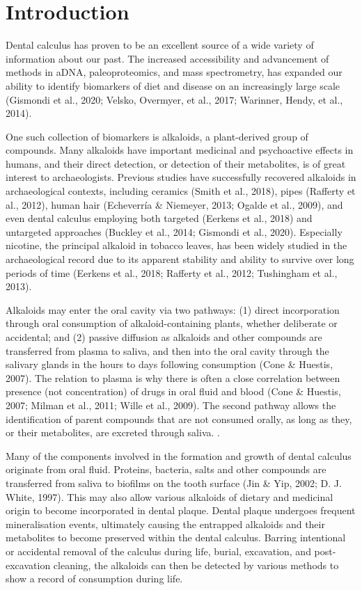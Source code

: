 \documentclass[
  letterpaper,
]{book}
\begin{document}
\hypertarget{mb11CalculusPilot}{%
\section{Introduction}\label{mb11CalculusPilot}}

Dental calculus has proven to be an excellent source of a wide variety
of information about our past. The increased accessibility and
advancement of methods in aDNA, paleoproteomics, and mass spectrometry,
has expanded our ability to identify biomarkers of diet and disease on
an increasingly large scale (Gismondi et al., 2020; Velsko, Overmyer, et
al., 2017; Warinner, Hendy, et al., 2014).

One such collection of biomarkers is alkaloids, a plant-derived group of
compounds. Many alkaloids have important medicinal and psychoactive
effects in humans, and their direct detection, or detection of their
metabolites, is of great interest to archaeologists. Previous studies
have successfully recovered alkaloids in archaeological contexts,
including ceramics (Smith et al., 2018), pipes (Rafferty et al., 2012),
human hair (Echeverría \& Niemeyer, 2013; Ogalde et al., 2009), and even
dental calculus employing both targeted (Eerkens et al., 2018) and
untargeted approaches (Buckley et al., 2014; Gismondi et al., 2020).
Especially nicotine, the principal alkaloid in tobacco leaves, has been
widely studied in the archaeological record due to its apparent
stability and ability to survive over long periods of time (Eerkens et
al., 2018; Rafferty et al., 2012; Tushingham et al., 2013).

Alkaloids may enter the oral cavity via two pathways: (1) direct
incorporation through oral consumption of alkaloid-containing plants,
whether deliberate or accidental; and (2) passive diffusion as alkaloids
and other compounds are transferred from plasma to saliva, and then into
the oral cavity through the salivary glands in the hours to days
following consumption (Cone \& Huestis, 2007). The relation to plasma is
why there is often a close correlation between presence (not
concentration) of drugs in oral fluid and blood (Cone \& Huestis, 2007;
Milman et al., 2011; Wille et al., 2009). The second pathway allows the
identification of parent compounds that are not consumed orally, as long
as they, or their metabolites, are excreted through saliva. .

Many of the components involved in the formation and growth of dental
calculus originate from oral fluid. Proteins, bacteria, salts and other
compounds are transferred from saliva to biofilms on the tooth surface
(Jin \& Yip, 2002; D. J. White, 1997). This may also allow various
alkaloids of dietary and medicinal origin to become incorporated in
dental plaque. Dental plaque undergoes frequent mineralisation events,
ultimately causing the entrapped alkaloids and their metabolites to
become preserved within the dental calculus. Barring intentional or
accidental removal of the calculus during life, burial, excavation, and
post-excavation cleaning, the alkaloids can then be detected by various
methods to show a record of consumption during life.
\end{document}

